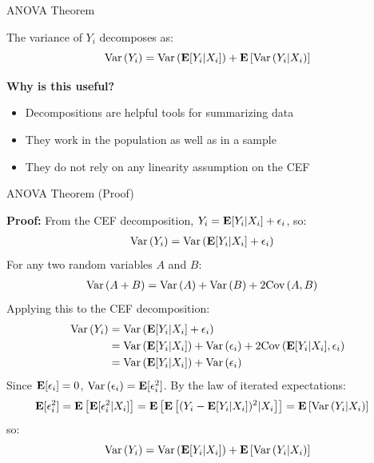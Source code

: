 \documentclass[compress, 8pt]{beamer}
\begin{document}
\begin{frame}{ANOVA Theorem}

The variance of $Y_i$ decomposes as:
\begin{equation*}
    \text{Var} \left( Y_i \right) = \text{Var} \left( \mathbf{E} [Y_i \vert X_i] \right) + \mathbf{E} \left[ \text{Var} \left( Y_i \vert X_i \right) \right]
\end{equation*}

\vspace{1ex}
\textbf{Why is this useful?}
\begin{itemize}
    \item Decompositions are helpful tools for summarizing data
    \item They work in the population as well as in a sample
    \item They do not rely on any linearity assumption on the CEF
\end{itemize}

\end{frame}

\begin{frame}{ANOVA Theorem (Proof)}

\textbf{Proof:} From the CEF decomposition, $Y_i = \mathbf{E} [Y_i \vert X_i] + \epsilon_i$, so:
\begin{align*}
    \text{Var} \left( Y_i \right) &= \text{Var} \left( \mathbf{E} [Y_i \vert X_i] + \epsilon_i \right)
\end{align*}
For any two random variables $A$ and $B$:
\begin{align*}
    \text{Var} \left( A + B \right) &= \text{Var} \left( A \right) + \text{Var} \left( B \right) + 2 \text{Cov} \left( A, B \right)
\end{align*}
Applying this to the CEF decomposition: 
\begin{align*}
    \text{Var} \left( Y_i \right) &= \text{Var} \left( \mathbf{E} [Y_i \vert X_i] + \epsilon_i \right) \\
    &= \text{Var} \left( \mathbf{E} [Y_i \vert X_i] \right) + \text{Var} \left( \epsilon_i \right) + 2 \text{Cov} \left( \mathbf{E} [Y_i \vert X_i], \epsilon_i \right) \\
    &= \text{Var} \left( \mathbf{E} [Y_i \vert X_i] \right) + \text{Var} \left( \epsilon_i \right)
\end{align*}
Since $\mathbf{E} [\epsilon_i] = 0$, $\text{Var} \left( \epsilon_i \right) = \mathbf{E} [\epsilon_i^2]$. By the law of iterated expectations:
\begin{align*}
    \mathbf{E} [\epsilon_i^2] &= \mathbf{E} \left[ \mathbf{E} [\epsilon_i^2 \vert X_i] \right] = \mathbf{E} \left[ \mathbf{E} \left[ (Y_i - \mathbf{E} [Y_i \vert X_i])^2 \vert X_i \right] \right] = \mathbf{E} \left[ \text{Var} \left( Y_i \vert X_i \right) \right]
\end{align*}
so:
\begin{equation*}
    \text{Var} \left( Y_i \right) = \text{Var} \left( \mathbf{E} [Y_i \vert X_i] \right) + \mathbf{E} \left[ \text{Var} \left( Y_i \vert X_i \right) \right]
\end{equation*}



\end{frame}
\end{document}
